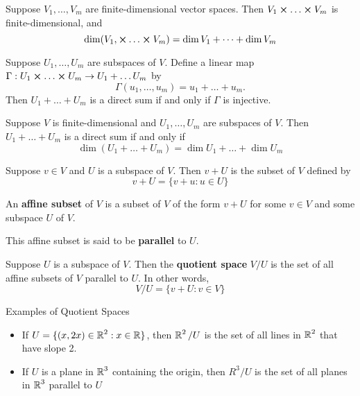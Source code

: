 \begin{theorem} 
   Suppose $V_1, \dots, V_m$ are finite-dimensional vector spaces.
   Then $V_1 \cross \dots \cross V_m$ is finite-dimensional, and
   \[ \dim(V_1, \cross \dots \cross V_m) = \dim V_1 + \dots + \dim V_m \]
\end{theorem}

\begin{theorem}
   Suppose $U_1, \dots, U_m$ are subspaces of $V$.
   Define a linear map $\Gamma: U_1 \cross \dots \cross U_m \to U_1 + \dots U_m$ by
   \[ \Gamma(u_1, \dots, u_m) = u_1 + \dots + u_m. \]
   Then $U_1 + \dots + U_m$ is a direct sum if and only if $\Gamma$ is injective.
\end{theorem}

\begin{theorem}
   Suppose $V$ is finite-dimensional and $U_1, \dots, U_m$ are subspaces of $V$.
   Then $U_1 + \dots + U_m$ is a direct sum if and only if
   \[ \dim(U_1 + \dots + U_m) = \dim U_1 + \dots + \dim U_m \]
\end{theorem}

\begin{definition}
   Suppose $v \in V$ and $U$ is a subspace of $V$. Then $v + U$ is
   the subset of $V$ defined by
   \[ v+U = \{v+u : u \in U \} \]
\end{definition}

\begin{definition} 
   An \textbf{affine subset} of $V$ is a subset of $V$ of the form
   $v + U$ for some $v \in V$ and some subspace $U$ of $V$.

   This affine subset is said to be \textbf{parallel} to $U$.
\end{definition}

\begin{definition}
   Suppose $U$ is a subspace of $V$. Then the \textbf{quotient space}
   $V / U$ is the set of all affine subsets of $V$ parallel to $U$. In other words,
   \[ V/U = \{ v+U : v \in V \} \]
\end{definition}

\begin{example} Examples of Quotient Spaces
   \begin{itemize}
      \item If $U = \{(x, 2x) \in \operatorname{\mathbb{R}}^2 : x \in \operatorname{\mathbb{R}} \}$, then $\operatorname{\mathbb{R}}^2 / U$ is the set of all lines
      in $\operatorname{\mathbb{R}}^2$ that have slope 2.
      \item If $U$ is a plane in $\operatorname{\mathbb{R}}^3$ containing the origin, then $R^3/U$ is the set of all planes
      in $\operatorname{\mathbb{R}}^3$ parallel to $U$
   \end{itemize}
\end{example}

